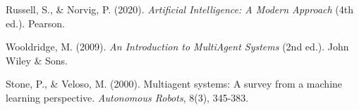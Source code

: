 \documentclass[10pt,twocolumn]{article}
\begin{document}
\begin{thebibliography}{9}

Russell, S., \& Norvig, P. (2020). \textit{Artificial Intelligence: A Modern Approach} (4th ed.). Pearson.

Wooldridge, M. (2009). \textit{An Introduction to MultiAgent Systems} (2nd ed.). John Wiley \& Sons.

Stone, P., \& Veloso, M. (2000). Multiagent systems: A survey from a machine learning perspective. \textit{Autonomous Robots}, 8(3), 345-383.

\end{thebibliography}
\end{document}
